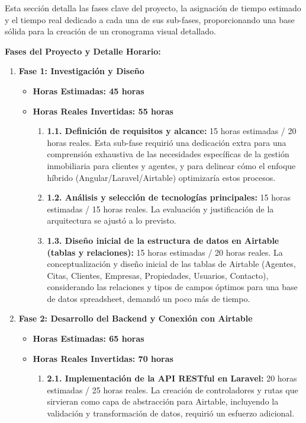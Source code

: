 Esta sección detalla las fases clave del proyecto, la asignación de tiempo estimado y el tiempo real dedicado a cada una de sus sub-fases, proporcionando una base sólida para la creación de un cronograma visual detallado.

\textbf{Fases del Proyecto y Detalle Horario:}

\begin{enumerate}
    \item \textbf{Fase 1: Investigación y Diseño}
    \begin{itemize}
        \item \textbf{Horas Estimadas: 45 horas}
        \item \textbf{Horas Reales Invertidas: 55 horas}
        \begin{enumerate}
            \item \textbf{1.1. Definición de requisitos y alcance:} 15 horas estimadas / 20 horas reales. Esta sub-fase requirió una dedicación extra para una comprensión exhaustiva de las necesidades específicas de la gestión inmobiliaria para clientes y agentes, y para delinear cómo el enfoque híbrido (Angular/Laravel/Airtable) optimizaría estos procesos.
            \item \textbf{1.2. Análisis y selección de tecnologías principales:} 15 horas estimadas / 15 horas reales. La evaluación y justificación de la arquitectura se ajustó a lo previsto.
            \item \textbf{1.3. Diseño inicial de la estructura de datos en Airtable (tablas y relaciones):} 15 horas estimadas / 20 horas reales. La conceptualización y diseño inicial de las tablas de Airtable (Agentes, Citas, Clientes, Empresas, Propiedades, Usuarios, Contacto), considerando las relaciones y tipos de campos óptimos para una base de datos spreadsheet, demandó un poco más de tiempo.
        \end{enumerate}
    \end{itemize}
    \item \textbf{Fase 2: Desarrollo del Backend y Conexión con Airtable}
    \begin{itemize}
        \item \textbf{Horas Estimadas: 65 horas}
        \item \textbf{Horas Reales Invertidas: 70 horas}
        \begin{enumerate}
            \item \textbf{2.1. Implementación de la API RESTful en Laravel:} 20 horas estimadas / 25 horas reales. La creación de controladores y rutas que sirvieran como capa de abstracción para Airtable, incluyendo la validación y transformación de datos, requirió un esfuerzo adicional.

\end{enumerate}
\end{itemize}
\end{enumerate}
